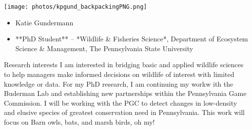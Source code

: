 \begin{frame}
\begin{multicols}{2}

  \null \vfill
  \texttt{[image: photos/kpgund\_backpackingPNG.png]}
  \vfill \null

\columnbreak

  \null \vfill
  \begin{itemize}
    \item Katie Gundermann
    \item **PhD Student** – *Wildlife & Fisheries Science*, Department of Ecosystem Science & Management, The Pennsylvania State University
  \end{itemize}
  \vfill \null
\end{multicols}
\end{frame}

\begin{frame}{Research interests}
\protect\hypertarget{research-interests}{}
I am interested in bridging basic and applied wildlife sciences to help
managers make informed decisions on wildlife of interest with limited
knowledge or data. For my PhD research, I am continuing my workw ith the
Buderman Lab and establishing new partnerships within the Pennsylvania
Game Commission. I will be working with the PGC to detect changes in
low-density and elusive species of greatest conservation need in
Pennsylvania. This work will focus on Barn owls, bats, and marsh birds,
oh my!
\end{frame}
